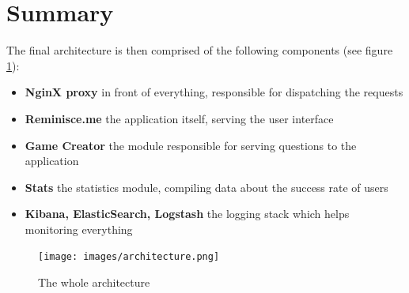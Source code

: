\section{Summary}
The final architecture is then comprised of the following components (see figure \ref{fig:architecture}):
\begin{itemize}
	\item \textbf{NginX proxy} in front of everything, responsible for dispatching the requests
	\item \textbf{Reminisce.me} the application itself, serving the user interface
	\item \textbf{Game Creator} the module responsible for serving questions to the application
	\item \textbf{Stats} the statistics module, compiling data about the success rate of users
	\item \textbf{Kibana, ElasticSearch, Logstash} the logging stack which helps monitoring everything
\end{itemize}
\begin{figure}
\centering
{\texttt{[image: images/architecture.png]}}
\caption{The whole architecture}
\label{fig:architecture}
\end{figure}